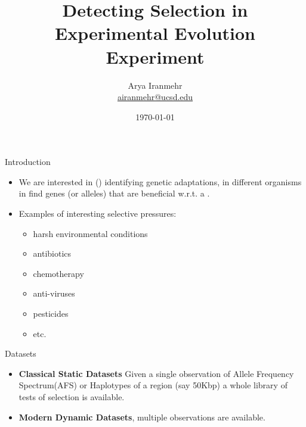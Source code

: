 \documentclass[t]{beamer} %
\title{Detecting Selection in Experimental Evolution Experiment}
\subtitle{}
\author[Arya Iranmehr]
{%
  \texorpdfstring{
      \centering
      Arya Iranmehr\\
      \href{mailto:airanmehr@ucsd.edu}{airanmehr@ucsd.edu}
  }
  {Arya Iranmehr}
}
\institute{
Bafna Lab\\
University of California, San Diego}
\date{
\monthyeardate\today}
\begin{document}
\begin{frame}
  \titlepage
\end{frame}


\begin{frame}{Introduction}
\begin{itemize}
\item We are interested in () identifying genetic adaptations, 
in different organisms in find genes (or alleles) that are beneficial 
w.r.t. a  .
\item Examples of interesting selective pressures:
\begin{itemize}
	\item harsh environmental conditions
	\item antibiotics
	\item chemotherapy
	\item anti-viruses
	\item pesticides 
	\item etc.
\end{itemize} 
\end{itemize}
\end{frame}



\begin{frame}{Datasets}
\begin{itemize}
\item {\bf Classical Static Datasets}
Given a single observation of Allele 
Frequency Spectrum(AFS) or Haplotypes of a region (say 50Kbp) a whole library 
of tests of selection is available.
\item {\bf Modern Dynamic Datasets}, multiple observations are available.
\end{itemize}
\end{frame}
\end{document}
